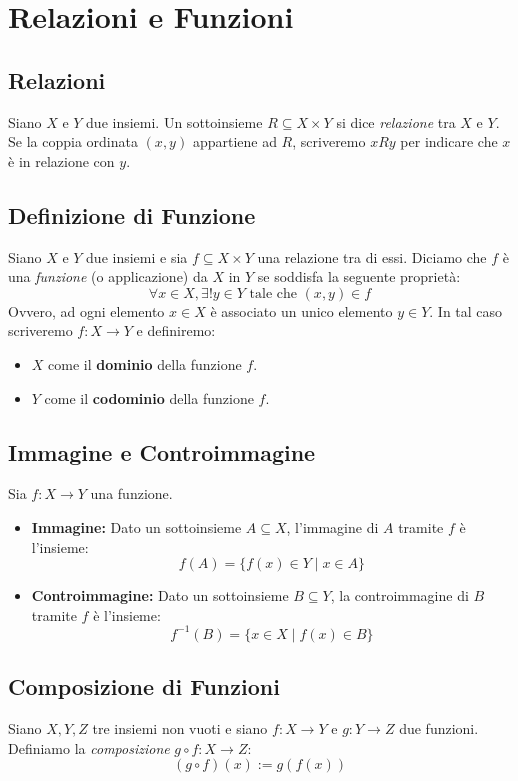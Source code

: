 \documentclass[12pt, a4paper]{article}
\begin{document}
\section{Relazioni e Funzioni}

\subsection{Relazioni}
Siano $X$ e $Y$ due insiemi. Un sottoinsieme $R \subseteq X \times Y$ si dice \emph{relazione} tra $X$ e $Y$. Se la coppia ordinata $(x, y)$ appartiene ad $R$, scriveremo $x R y$ per indicare che $x$ è in relazione con $y$.

\subsection{Definizione di Funzione}
Siano $X$ e $Y$ due insiemi e sia $f \subseteq X \times Y$ una relazione tra di essi. Diciamo che $f$ è una \emph{funzione} (o applicazione) da $X$ in $Y$ se soddisfa la seguente proprietà:
\[ \forall x \in X, \exists! y \in Y \text{ tale che } (x, y) \in f \]
Ovvero, ad ogni elemento $x \in X$ è associato un unico elemento $y \in Y$. In tal caso scriveremo $f: X \to Y$ e definiremo:
\begin{itemize}
    \item $X$ come il \textbf{dominio} della funzione $f$.
    \item $Y$ come il \textbf{codominio} della funzione $f$.
\end{itemize}

\subsection{Immagine e Controimmagine}
Sia $f: X \to Y$ una funzione.
\begin{itemize}
    \item \textbf{Immagine:} Dato un sottoinsieme $A \subseteq X$, l'immagine di $A$ tramite $f$ è l'insieme:
    \[ f(A) = \{f(x) \in Y \mid x \in A\} \]
    \item \textbf{Controimmagine:} Dato un sottoinsieme $B \subseteq Y$, la controimmagine di $B$ tramite $f$ è l'insieme:
    \[ f^{-1}(B) = \{x \in X \mid f(x) \in B\} \]
\end{itemize}

\subsection{Composizione di Funzioni}
Siano $X, Y, Z$ tre insiemi non vuoti e siano $f: X \to Y$ e $g: Y \to Z$ due funzioni. Definiamo la \emph{composizione} $g \circ f: X \to Z$:
\[ (g \circ f)(x) := g(f(x)) \]
\end{document}
